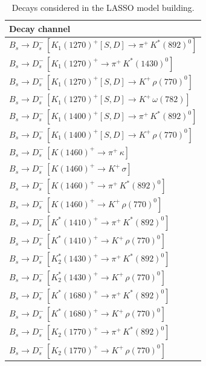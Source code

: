 \begin{table}[h]
  \footnotesize
  \centering
  \caption{Decays considered in the LASSO model building. \label{tab:components}}
           \begin{tabular} {@{\hspace{0.5cm}}l@{\hspace{0.25cm}}}
     \hline \hline
	 Decay channel  \\ \hline
              $B_s \to D_s^- \, [K_{1}(1270)^{+}[S,D]\to \pi^+ \, K^{*}(892)^{0}]$ \\
              $B_s \to D_s^- \, [K_{1}(1270)^{+}\to \pi^+ \, K^{*}(1430)^{0}]$ \\
              $B_s \to D_s^- \, [K_{1}(1270)^{+}[S,D]\to K^+ \, \rho(770)^{0}]$ \\
              $B_s \to D_s^- \, [K_{1}(1270)^{+}[S,D]\to K^+ \, \omega(782)]$ \\
              $B_s \to D_s^- \, [K_{1}(1400)^{+}[S,D]\to \pi^+ \, K^{*}(892)^{0}]$ \\
              $B_s \to D_s^- \, [K_{1}(1400)^{+}[S,D]\to K^+ \, \rho(770)^{0}]$ \\
              $B_s \to D_s^- \, [K(1460)^{+}\to \pi^+ \, \kappa]$ \\
              $B_s \to D_s^- \, [K(1460)^{+}\to K^+ \, \sigma]$ \\
              $B_s \to D_s^- \, [K(1460)^{+}\to \pi^+ \, K^{*}(892)^{0}]$ \\
              $B_s \to D_s^- \, [K(1460)^{+}\to K^+ \, \rho(770)^{0}]$ \\
              $B_s \to D_s^- \, [K^{*}(1410)^+\to \pi^+\, K^{*}(892)^{0}]$ \\
              $B_s \to D_s^- \, [K^{*}(1410)^+\to K^+ \, \rho(770)^{0}]$ \\
              $B_s \to D_s^- \, [K_{2}^*(1430)^{+}\to \pi^+ \, K^{*}(892)^{0}]$ \\
              $B_s \to D_s^- \, [K_{2}^*(1430)^{+}\to K^+ \, \rho(770)^{0}]$ \\
              $B_s \to D_s^- \, [K^*(1680)^{+}\to \pi^+ \, K^{*}(892)^{0}]$ \\
              $B_s \to D_s^- \, [K^*(1680)^{+}\to K^+ \, \rho(770)^{0}]$ \\      
               $B_s \to D_s^- \, [K_{2}(1770)^{+}\to \pi^+ \, K^{*}(892)^{0}]$ \\
              $B_s \to D_s^- \, [K_{2}(1770)^{+}\to K^+ \, \rho(770)^{0}]$ \\

\end{tabular}
\end{table}
